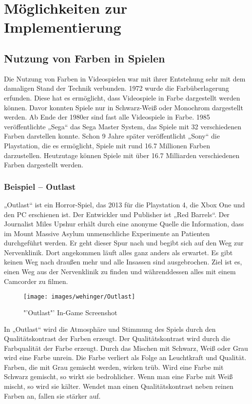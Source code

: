 \chapter{Möglichkeiten zur Implementierung}

\section{Nutzung von Farben in Spielen}
Die Nutzung von Farben in Videospielen war mit ihrer Entstehung sehr mit dem damaligen Stand der Technik verbunden. 1972 wurde die Farbüberlagerung erfunden. Diese hat es ermöglicht, dass Videospiele in Farbe dargestellt werden können. Davor konnten Spiele nur in Schwarz-Weiß oder Monochrom dargestellt werden. Ab Ende der 1980er sind fast alle Videospiele in Farbe. 1985 veröffentlichte „Sega“ das Sega Master System, das Spiele mit 32 verschiedenen Farben darstellen konnte. Schon 9 Jahre später veröffentlicht „Sony“ die Playstation, die es ermöglicht, Spiele mit rund 16.7 Millionen Farben darzustellen. Heutzutage können Spiele mit über 16.7 Milliarden verschiedenen Farben dargestellt werden.  
\cite{_the_video_game_explosion}
\cite{_farbkontraste_im_gaming}

\subsection{Beispiel – Outlast}
„Outlast“ ist ein Horror-Spiel, das 2013 für die Playstation 4, die Xbox One und den PC erschienen ist. Der Entwickler und Publisher ist „Red Barrels“. Der Journalist Miles Upshur erhält durch eine anonyme Quelle die Information, dass im Mount Massive Asylum unmenschliche Experimente an Patienten durchgeführt werden. Er geht dieser Spur nach und begibt sich auf den Weg zur Nervenklinik. Dort angekommen läuft alles ganz anders als erwartet. Es gibt keinen Weg nach draußen mehr und alle Insassen sind ausgebrochen. Ziel ist es, einen Weg aus der Nervenklinik zu finden und währenddessen alles mit einem Camcorder zu filmen. 
\cite{_outlast}
\cite{_farbkontraste_im_gaming}

\begin{figure}[H]
	\centering
	\texttt{[image: images/wehinger/Outlast]}
	\caption{"'Outlast"' In-Game Screenshot\cite{_drawing_basics_and_video_game_art}}
\end{figure}

In „Outlast“ wird die Atmosphäre und Stimmung des Spiels durch den Qualitätskontrast der Farben erzeugt. Der Qualitätskontrast wird durch die Farbqualität der Farbe erzeugt. Durch das Mischen mit Schwarz, Weiß oder Grau wird eine Farbe unrein. Die Farbe verliert als Folge an Leuchtkraft und Qualität. Farben, die mit Grau gemischt werden, wirken trüb. Wird eine Farbe mit Schwarz gemischt, so wirkt sie bedrohlicher. Wenn man eine Farbe mit Weiß mischt, so wird sie kälter. Wendet man einen Qualitätskontrast neben reinen Farben an, fallen sie stärker auf. 
\cite{_farbkontraste}
\cite{_outlast}
\cite{_farbkontraste_im_gaming}

